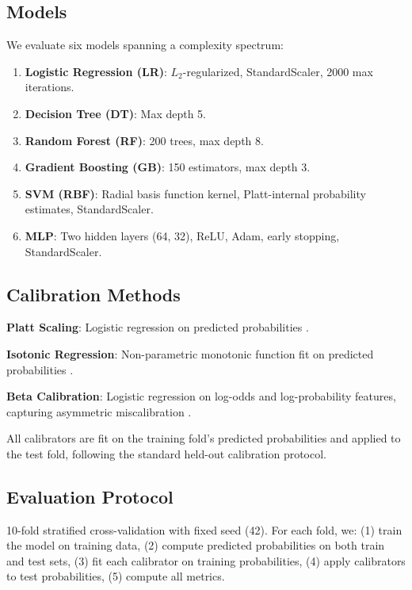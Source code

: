 \documentclass[preprint,12pt]{elsarticle}
\begin{document}
\subsection{Models}

We evaluate six models spanning a complexity spectrum:

\begin{enumerate}
    \item \textbf{Logistic Regression (LR)}: $L_2$-regularized, StandardScaler, 2000 max iterations.
    \item \textbf{Decision Tree (DT)}: Max depth 5.
    \item \textbf{Random Forest (RF)}: 200 trees, max depth 8.
    \item \textbf{Gradient Boosting (GB)}: 150 estimators, max depth 3.
    \item \textbf{SVM (RBF)}: Radial basis function kernel, Platt-internal probability estimates, StandardScaler.
    \item \textbf{MLP}: Two hidden layers (64, 32), ReLU, Adam, early stopping, StandardScaler.
\end{enumerate}

\subsection{Calibration Methods}

\textbf{Platt Scaling}: Logistic regression on predicted probabilities \citep{platt1999}.

\textbf{Isotonic Regression}: Non-parametric monotonic function fit on predicted probabilities \citep{zadrozny2002}.

\textbf{Beta Calibration}: Logistic regression on log-odds and log-probability features, capturing asymmetric miscalibration \citep{kull2017}.

All calibrators are fit on the training fold's predicted probabilities and applied to the test fold, following the standard held-out calibration protocol.

\subsection{Evaluation Protocol}

10-fold stratified cross-validation with fixed seed (42). For each fold, we: (1) train the model on training data, (2) compute predicted probabilities on both train and test sets, (3) fit each calibrator on training probabilities, (4) apply calibrators to test probabilities, (5) compute all metrics.
\end{document}
